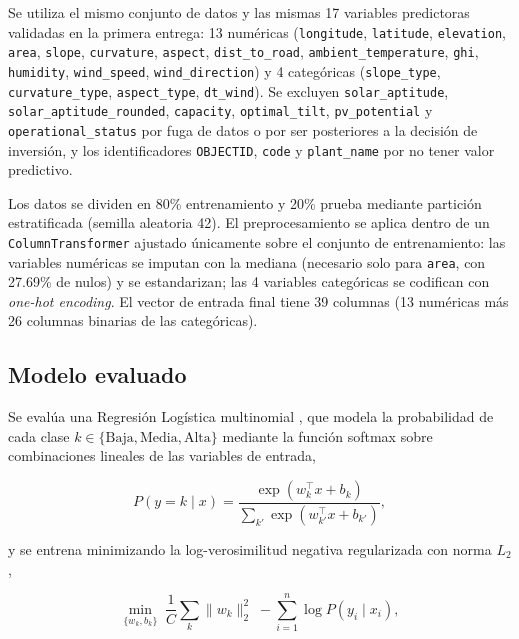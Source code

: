 \documentclass[pdflatex,sn-mathphys-num]{sn-jnl}
\begin{document}
Se utiliza el mismo conjunto de datos y las mismas 17 variables predictoras validadas en la primera entrega: 13 numéricas (\texttt{longitude}, \texttt{latitude}, \texttt{elevation}, \texttt{area}, \texttt{slope}, \texttt{curvature}, \texttt{aspect}, \texttt{dist\_to\_road}, \texttt{ambient\_temperature}, \texttt{ghi}, \texttt{humidity}, \texttt{wind\_speed}, \texttt{wind\_direction}) y 4 categóricas (\texttt{slope\_type}, \texttt{curvature\_type}, \texttt{aspect\_type}, \texttt{dt\_wind}). Se excluyen \texttt{solar\_aptitude}, \texttt{solar\_aptitude\_rounded}, \texttt{capacity}, \texttt{optimal\_tilt}, \texttt{pv\_potential} y \texttt{operational\_status} por fuga de datos o por ser posteriores a la decisión de inversión, y los identificadores \texttt{OBJECTID}, \texttt{code} y \texttt{plant\_name} por no tener valor predictivo.

Los datos se dividen en 80\% entrenamiento y 20\% prueba mediante partición estratificada (semilla aleatoria 42). El preprocesamiento se aplica dentro de un \texttt{ColumnTransformer} ajustado únicamente sobre el conjunto de entrenamiento: las variables numéricas se imputan con la mediana (necesario solo para \texttt{area}, con 27.69\% de nulos) y se estandarizan; las 4 variables categóricas se codifican con \textit{one-hot encoding}. El vector de entrada final tiene 39 columnas (13 numéricas más 26 columnas binarias de las categóricas).

\subsection{Modelo evaluado}\label{subsec:modelo}

Se evalúa una Regresión Logística multinomial \cite{bib2}, que modela la probabilidad de cada clase $k \in \{\text{Baja}, \text{Media}, \text{Alta}\}$ mediante la función softmax sobre combinaciones lineales de las variables de entrada,

\begin{equation}
P(y = k \mid x) = \frac{\exp(w_k^\top x + b_k)}{\sum_{k'} \exp(w_{k'}^\top x + b_{k'})},
\label{eq:softmax}
\end{equation}

\noindent y se entrena minimizando la log-verosimilitud negativa regularizada con norma $L_2$,

\begin{equation}
\min_{\{w_k, b_k\}} \; \frac{1}{C}\sum_{k} \lVert w_k \rVert_2^2 \; - \sum_{i=1}^{n} \log P(y_i \mid x_i),
\label{eq:logloss}
\end{equation}
\end{document}
